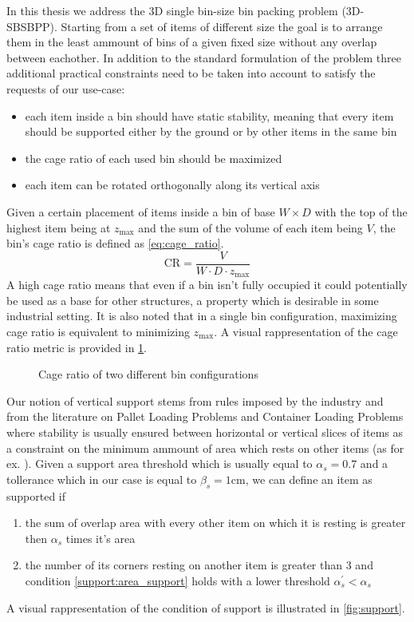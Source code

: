 In this thesis we address the 3D single bin-size bin packing problem (3D-SBSBPP). Starting from a set of items of different size the goal is to arrange them in the least ammount of bins of a given fixed size without any overlap between eachother.
In addition to the standard formulation of the problem three additional practical constraints need to be taken into account to satisfy the requests of our use-case:
\begin{itemize}
    \item each item inside a bin should have static stability, meaning that every item should be supported either by the ground or by other items in the same bin
    \item the cage ratio of each used bin should be maximized
    \item each item can be rotated orthogonally along its vertical axis
\end{itemize}

Given a certain placement of items inside a bin of base $W \times D$ with the top of the highest item being at $z_\text{max}$ and the sum of the volume of each item being $V$, the bin's cage ratio is defined as \cref{eq:cage_ratio}.
\begin{equation}
    \label{eq:cage_ratio}
    \text{CR} = \frac{V}{W \cdot D \cdot z_\text{max}}
\end{equation}
A high cage ratio means that even if a bin isn't fully occupied it could potentially be used as a base for other structures, a property which is desirable in some industrial setting.
It is also noted that in a single bin configuration, maximizing cage ratio is equivalent to minimizing $z_\text{max}$. A visual rappresentation of the cage ratio metric is provided in \cref{fig:cage_ratio}.

\begin{figure}[H]
    \scalebox{0.60}{%
    
    }
    \caption{Cage ratio of two different bin configurations}
    \label{fig:cage_ratio}
\end{figure}

Our notion of vertical support stems from rules imposed by the industry and from the literature on Pallet Loading Problems and Container Loading Problems where stability is usually ensured between horizontal or vertical slices of items as a constraint on the minimum ammount of area which rests on other items (as for ex. \citep{elhedhli2019three,kurpel2020exact,paquay2016mixed}).
Given a support area threshold which is usually equal to $\alpha_s=0.7$ and a tollerance which in our case is equal to $\beta_s=1\text{cm}$, we can define an item as supported if
\begin{enumerate}
    \item the sum of overlap area with every other item on which it is resting is greater then $\alpha_s$ times it's area \label{support:area_support}
    \item the number of its corners resting on another item is greater than 3 and condition \ref{support:area_support} holds with a lower threshold $\alpha^\prime_s < \alpha_s$ \label{support:vertex_support}
\end{enumerate}
A visual rappresentation of the condition of support is illustrated in \cref{fig:support}.

